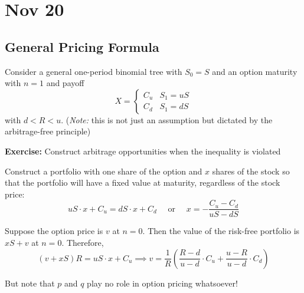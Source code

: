 \documentclass[12pt]{report}
\newenvironment*{exercise}[1][red]{
    \begin{tcolorbox}[
        parbox=false,
        colback=#1!5!white,
        colframe=#1!75!black,
        breakable
    ]}
    {\end{tcolorbox}}
\begin{document}
\section{Nov 20}
\subsection{General Pricing Formula}
    Consider a general one-period binomial tree with $S_0 = S$ and an option maturity with $n=1$ and payoff 
    \[X = \begin{cases}
        C_u & S_1 = uS\\
        C_d & S_1 = dS
    \end{cases}\]
    with $d < R < u$. (\emph{Note:} this is not just an assumption but dictated by the arbitrage-free principle)

    \begin{exercise}
        \textbf{Exercise:} Construct arbitrage opportunities when the inequality is violated
    \end{exercise}

    Construct a portfolio with one share of the option and $x$ shares of the stock so that the portfolio will have a fixed value at maturity, regardless of the stock price: 
    \[uS \cdot x + C_u = dS \cdot x + C_d \quad \text{ or } \quad x = -\frac{C_u - C_d}{uS - dS}\]

    Suppose the option price is $v$ at $n = 0$. Then the value of the risk-free portfolio is $xS + v$ at $n = 0$. Therefore, 
    \[(v + xS)R = uS\cdot x + C_u \implies v = \frac{1}{R}\left(\frac{R-d}{u -d} \cdot C_u + \frac{u-R}{u-d} \cdot C_d\right) \] 

    But note that $p$ and $q$ play no role in option pricing whatsoever! 
\end{document}
